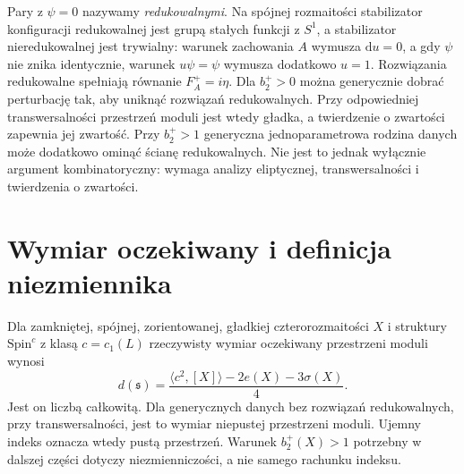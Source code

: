 \begin{uwaga}
Pary z $\psi=0$ nazywamy \emph{redukowalnymi}.
Na spójnej rozmaitości stabilizator konfiguracji
redukowalnej jest grupą stałych funkcji z $S^1$,
a stabilizator nieredukowalnej jest trywialny:
warunek zachowania $A$ wymusza $\mathrm du=0$,
a gdy $\psi$ nie znika identycznie, warunek
$u\psi=\psi$ wymusza dodatkowo $u=1$.
Rozwiązania redukowalne spełniają
równanie $F_A^+=i\eta$.
Dla $b_2^+>0$ można generycznie dobrać perturbację
tak, aby uniknąć rozwiązań redukowalnych. Przy odpowiedniej
transwersalności przestrzeń moduli jest wtedy gładka,
a twierdzenie o zwartości zapewnia jej zwartość.
Przy $b_2^+>1$ generyczna jednoparametrowa rodzina danych
może dodatkowo ominąć ścianę redukowalnych. Nie jest to jednak wyłącznie argument
kombinatoryczny: wymaga analizy eliptycznej, transwersalności
i twierdzenia o zwartości.
\end{uwaga}

\section{Wymiar oczekiwany i definicja niezmiennika}
\label{sec:tg-sw-dimension}

\begin{twierdzenie}
\label{thm:tg-sw-dimension}
Dla zamkniętej, spójnej, zorientowanej,
gładkiej czterorozmaitości $X$ i struktury
$\mathrm{Spin}^c$ z klasą $c=c_1(L)$ rzeczywisty
wymiar oczekiwany przestrzeni moduli wynosi
\[
d(\mathfrak s)=\frac{\langle c^2,[X]\rangle-2e(X)-3\sigma(X)}4.
\]
Jest on liczbą całkowitą. Dla generycznych danych bez rozwiązań
redukowalnych, przy transwersalności, jest to
wymiar niepustej przestrzeni moduli.
Ujemny indeks oznacza wtedy pustą przestrzeń.
Warunek $b_2^+(X)>1$ potrzebny w dalszej części
dotyczy niezmienniczości, a nie samego rachunku indeksu.
\end{twierdzenie}

